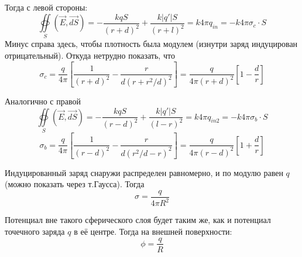 \documentclass[a4paper,14pt]{extarticle}
\begin{document}
\begin{figure}[H]
    \centering
\end{figure}
Тогда с левой стороны:
\begin{equation}
	\oiint\limits_{S}(\vec{E},\vec{dS})=
	-\frac{kqS}{(r+d)^2}+
	\frac{k|q'|S}{(r+l)^2}
	=k4\pi q_{in}= -k4\pi\sigma_c\cdot S
\end{equation}
Минус справа здесь, чтобы плотность была модулем (изнутри заряд индуцирован отрицательный).
Откуда нетрудно показать, что
\begin{equation}
	\sigma_c=\frac{q}{4\pi}
	\left[
	\frac{1}{(r+d)^2}-
	\frac{r}{d(r+r^2/d)^2}
	\right]=
	\frac{q}{4\pi(r+d)^2}
	\left[
	1-\frac{d}{r}
	\right]
\end{equation}

Аналогично с правой 
\begin{equation}
	\oiint\limits_{S}(\vec{E},\vec{dS})=
	-
	\frac{kqS}{(r-d)^2}+
	\frac{k|q'|S}{(l-r)^2}
	=k4\pi q_{in2}= -k4\pi\sigma_b\cdot S
\end{equation}
\begin{equation}
	\sigma_b=\frac{q}{4\pi}
	\left[
	\frac{1}{(r-d)^2}-
	\frac{r}{d(r^2/d-r)^2}
	\right]=
	\frac{q}{4\pi(r-d)^2}
	\left[
	1+\frac{d}{r}
	\right]	
\end{equation}

Индуцированный заряд снаружи распределен равномерно, и по модулю равен $q$ (можно показать через т.Гаусса). Тогда
\begin{equation}
	\sigma=\frac{q}{4\pi R^2}
\end{equation}

Потенциал вне такого сферического слоя  будет таким же, как и потенциал точечного заряда $q$ в её центре. Тогда на внешней поверхности:
\begin{equation}
	\phi=\frac{q}{R}
\end{equation}
\end{document}
